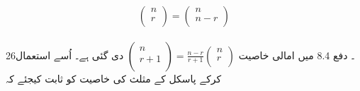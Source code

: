 \[  \begin{pmatrix}
n\\
r\\
\end{pmatrix}
=
\begin{pmatrix}
n\\
n-r\\
\end{pmatrix}\]
\\
26۔  دفع 8.4  میں امالی خاصیت
\( \begin{pmatrix}
n\\
r+1\\
\end{pmatrix}
=
\frac{n-r}{r+1}
\begin{pmatrix}
n\\
r\\
\end{pmatrix}\)
دی گئی ہے۔ اُسے استعمال کرکے پاسکل کے مثلث کی خاصیت کو ثابت کیجئے کہ

